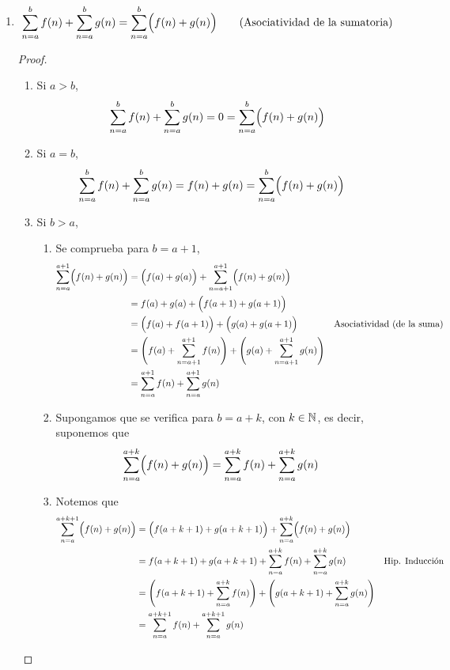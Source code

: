 \begin{enumerate}[label=\alph*)]
  \item \[\sum_{n=a}^{b} f(n) + \sum_{n=a}^{b} g(n) = \sum_{n=a}^{b} \Bigl(f(n) + g(n)\Bigr) \qquad \text{(Asociatividad de la sumatoria)}\]
  \begin{proof}\leavevmode
    \begin{enumerate}[label=\Roman*)]
      \item Si $a>b$,
      \begin{align*}
        \sum_{n=a}^{b} f(n) + \sum_{n=a}^{b} g(n) = 0 = \sum_{n=a}^{b} \Bigl(f(n) + g(n)\Bigr)
      \end{align*}
      \item Si $a=b$,
      \begin{align*}
        \sum_{n=a}^{b} f(n) + \sum_{n=a}^{b} g(n) &= f(n) + g(n) = \sum_{n=a}^{b} \Bigl(f(n) + g(n)\Bigr)
      \end{align*}
      \item Si $b>a$,
      \begin{enumerate}[label=\roman*)]
        \item Se comprueba para $b=a+1$,
        \begin{align*}
          \sum_{n=a}^{a+1} \Bigl(f(n) + g(n)\Bigr) &= \Bigl(f(a) + g(a)\Bigr) + \sum_{n=a+1}^{a+1} \Bigl(f(n) + g(n)\Bigr)\\
          &= f(a) + g(a) + \Bigl(f(a+1) + g(a+1)\Bigr)\\
          &= \Bigl(f(a) + f(a+1)\Bigr) + \Bigl(g(a) + g(a+1)\Bigr) && \text{Asociatividad (de la suma)}\\
          &= \Biggl(f(a) + \sum_{n=a+1}^{a+1} f(n)\Biggr) + \Biggl(g(a) + \sum_{n=a+1}^{a+1} g(n)\Biggr)\\
          &= \sum_{n=a}^{a+1} f(n) + \sum_{n=a}^{a+1} g(n)
        \end{align*}
        \item Supongamos que se verifica para $b=a+k$, con $k\in \mathbb{N}$, es decir, suponemos que
        \begin{align*}
          \sum_{n=a}^{a+k} \Bigl(f(n) + g(n)\Bigr) &= \sum_{n=a}^{a+k} f(n) + \sum_{n=a}^{a+k} g(n)
        \end{align*}
        \item Notemos que
        \begin{align*}
          \sum_{n=a}^{a+k+1} \Bigl(f(n) + g(n)\Bigr) &= \Bigl(f(a+k+1) + g(a+k+1)\Bigr) + \sum_{n=a}^{a+k} \Bigl(f(n) + g(n)\Bigr)\\
          &= f(a+k+1) + g(a+k+1) + \sum_{n=a}^{a+k} f(n) + \sum_{n=a}^{a+k} g(n) && \text{Hip. Inducción}\\
          &= \Biggl(f(a+k+1) + \sum_{n=a}^{a+k} f(n)\Biggr) + \Biggl(g(a+k+1) + \sum_{n=a}^{a+k} g(n)\Biggr)\\
          &= \sum_{n=a}^{a+k+1} f(n) + \sum_{n=a}^{a+k+1} g(n)
        \end{align*}
      \end{enumerate}
    \end{enumerate}
  \end{proof}



\end{enumerate}
